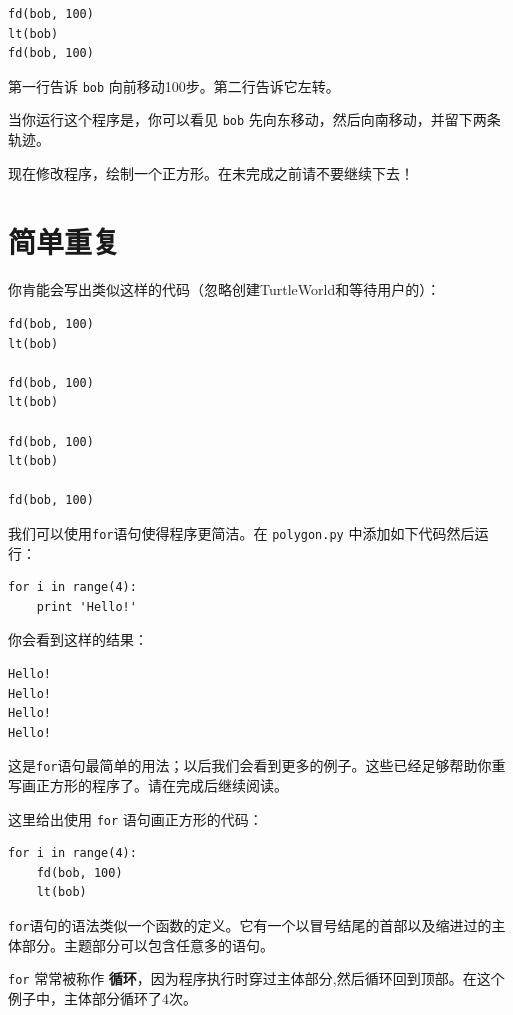 \beforeverb
\begin{verbatim}
fd(bob, 100)
lt(bob)
fd(bob, 100)
\end{verbatim}
\afterverb
%
第一行告诉 {\tt bob} 向前移动100步。第二行告诉它左转。

当你运行这个程序是，你可以看见 {\tt bob} 先向东移动，然后向南移动，并留下两条轨迹。

现在修改程序，绘制一个正方形。在未完成之前请不要继续下去！


\section{简单重复}
\label{重复}
你肯能会写出类似这样的代码（忽略创建TurtleWorld和等待用户的）：

\begin{verbatim}
fd(bob, 100)
lt(bob)

fd(bob, 100)
lt(bob)

fd(bob, 100)
lt(bob)

fd(bob, 100)
\end{verbatim}
%
我们可以使用{\tt for}语句使得程序更简洁。在 {\tt polygon.py} 中添加如下代码然后运行：


\beforeverb
\begin{verbatim}
for i in range(4):
    print 'Hello!'
\end{verbatim}
\afterverb
%
你会看到这样的结果：

\beforeverb
\begin{verbatim}
Hello!
Hello!
Hello!
Hello!
\end{verbatim}
\afterverb
%
这是{\tt for}语句最简单的用法；以后我们会看到更多的例子。这些已经足够帮助你重写画正方形的程序了。请在完成后继续阅读。


这里给出使用 {\tt for} 语句画正方形的代码：

\beforeverb
\begin{verbatim}
for i in range(4):
    fd(bob, 100)
    lt(bob)
\end{verbatim}
\afterverb
%
{\tt for}语句的语法类似一个函数的定义。它有一个以冒号结尾的首部以及缩进过的主体部分。主题部分可以包含任意多的语句。


{\tt for} 常常被称作 {\bf 循环}，因为程序执行时穿过主体部分,然后循环回到顶部。在这个例子中，主体部分循环了4次。

